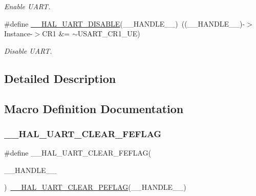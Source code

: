 \begin{DoxyCompactItemize}
\begin{DoxyCompactList}\small\item\em Enable U\+A\+RT. \end{DoxyCompactList}\item 
\#define \hyperlink{group___u_a_r_t___exported___macros_gad2f9fbdb4adf3a09939e201eaeea072f}{\+\_\+\+\_\+\+H\+A\+L\+\_\+\+U\+A\+R\+T\+\_\+\+D\+I\+S\+A\+B\+LE}(\+\_\+\+\_\+\+H\+A\+N\+D\+L\+E\+\_\+\+\_\+)~((\+\_\+\+\_\+\+H\+A\+N\+D\+L\+E\+\_\+\+\_\+)-\/$>$Instance-\/$>$C\+R1 \&=  $\sim$U\+S\+A\+R\+T\+\_\+\+C\+R1\+\_\+\+UE)
\begin{DoxyCompactList}\small\item\em Disable U\+A\+RT. \end{DoxyCompactList}\end{DoxyCompactItemize}


\subsection{Detailed Description}


\subsection{Macro Definition Documentation}
\mbox{\label{group___u_a_r_t___exported___macros_gae1dfc7777b089a10464841045b524caa}} 
\subsubsection{\texorpdfstring{\+\_\+\+\_\+\+H\+A\+L\+\_\+\+U\+A\+R\+T\+\_\+\+C\+L\+E\+A\+R\+\_\+\+F\+E\+F\+L\+AG}{\_\_HAL\_UART\_CLEAR\_FEFLAG}}
{\footnotesize\ttfamily \#define \+\_\+\+\_\+\+H\+A\+L\+\_\+\+U\+A\+R\+T\+\_\+\+C\+L\+E\+A\+R\+\_\+\+F\+E\+F\+L\+AG(\begin{DoxyParamCaption}\item[{}]{\+\_\+\+\_\+\+H\+A\+N\+D\+L\+E\+\_\+\+\_\+ }\end{DoxyParamCaption})~\hyperlink{group___u_a_r_t___exported___macros_gaba5e19c60e0f37341b1585a380b84d49}{\+\_\+\+\_\+\+H\+A\+L\+\_\+\+U\+A\+R\+T\+\_\+\+C\+L\+E\+A\+R\+\_\+\+P\+E\+F\+L\+AG}(\+\_\+\+\_\+\+H\+A\+N\+D\+L\+E\+\_\+\+\_\+)}



